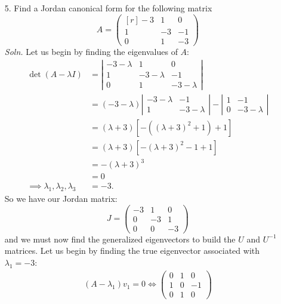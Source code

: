 \documentclass{article}
\begin{document}
\begin{itemize}
    
    \item[5.] Find a Jordan canonical form for the following matrix
    \[A = \begin{pmatrix*}[r]
        -3 & 1 & 0\\
        1 & -3 & -1\\
        0 & 1 & -3
    \end{pmatrix*}\]
    \textit{Soln.} Let us begin by finding the eigenvalues of $A$:
    \begin{align*}
        \det(A - \lambda I) &= \left|\begin{matrix}
            -3-\lambda & 1 & 0\\
            1 & -3-\lambda & -1\\
            0 & 1 & -3 - \lambda
        \end{matrix}\right|\\
        &= (-3 - \lambda)\left|\begin{matrix}
            -3-\lambda & -1\\
            1 & -3-\lambda
        \end{matrix}\right| - \left|\begin{matrix}
            1 & -1\\
            0 & -3 -\lambda
        \end{matrix}\right|\\
        &= (\lambda + 3)[-((\lambda + 3)^2 + 1) + 1]\\
        &= (\lambda+3)[-(\lambda + 3)^2 - 1 + 1]\\
        &= -(\lambda + 3)^3\\
        &= 0\\
        \implies \lambda_1,\lambda_2,\lambda_3 &= -3.
    \end{align*}
    So we have our Jordan matrix:
    \[J = \begin{pmatrix}
        -3 & 1 & 0\\
        0 & -3 & 1\\
        0 & 0 & -3
    \end{pmatrix}\]
    and we must now find the generalized eigenvectors to build the $U$ and $U^{-1}$ matrices. Let us begin by finding the true eigenvector associated with $\lambda_1 = -3$:
    \begin{align*}
        (A - \lambda_1)v_1 = 0
        \iff \begin{pmatrix}
            0 & 1 & 0\\
            1 & 0 & -1\\
            0 & 1 & 0

\end{pmatrix}
\end{align*}
\end{itemize}
\end{document}
